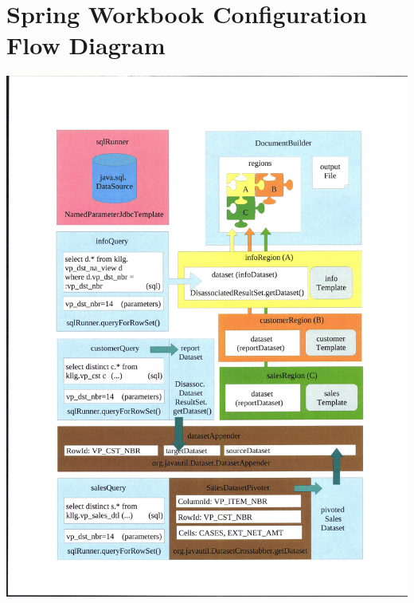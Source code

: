 \documentclass[letterpaper,10pt]{article}
\begin{document}
\section{Spring Workbook Configuration Flow Diagram}
\includegraphics*[width=\textwidth, viewport=0 0 2550  3300, bb=0 0 2550 3300]{SpringWorkbookConfigDiagram.png}
\end{document}
